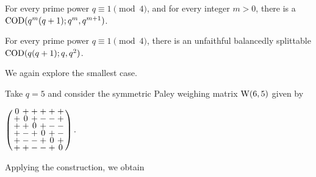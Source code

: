 \documentclass[../../../main]{subfiles}
\begin{document}
\begin{cor}
 For every prime power $q \equiv 1 \pmod{4}$, and for every integer $m>0$, there is a $\text{COD}(q^m(q+1); q^m, q^{m+1})$.
\end{cor}

\begin{cor}
 For every prime power $q \equiv 1 \pmod{4}$, there is an unfaithful balancedly splittable $\text{COD}(q(q+1); q, q^2)$.
\end{cor}

We again explore the smallest case.

\begin{ex}
 Take $q=5$ and consider the symmetric Paley weighing matrix $\text{W}(6,5)$ given by
 \begin{defenum}
  \item $
  \arraycolsep=1.25pt\def\arraystretch{0.625}
  \left(\begin{array}{cccccc}
   0&+&+&+&+&+\\
   +&0&+&-&-&+\\
   +&+&0&+&-&-\\
   +&-&+&0&+&-\\
   +&-&-&+&0&+\\
   +&+&-&-&+&0
  \end{array}\right).
  $
 \end{defenum}
 Applying the construction, we obtain
 \begin{defenum}[resume]
  \item {}
\end{defenum}
\end{ex}
\end{document}
